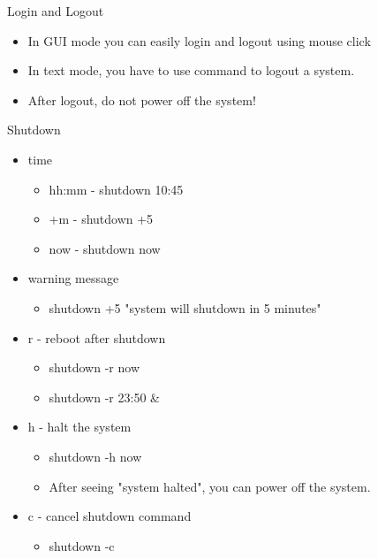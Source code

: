 \documentclass{beamer}
\begin{document}

\begin{frame}{Login and Logout}
\begin{itemize}
\item In GUI mode you can easily login and logout using mouse click
\item In text mode, you have to use command to logout a system.
\item After logout, do not power off the system!
\end{itemize}
\end{frame}

\begin{frame}{Shutdown}
\begin{itemize}
\item time
\begin{itemize}
\item hh:mm - shutdown 10:45
\item +m - shutdown +5
\item now - shutdown now
\end{itemize}
\item warning message
\begin{itemize}
\item shutdown +5 "system will shutdown in 5 minutes"
\end{itemize}
\item r - reboot after shutdown
\begin{itemize}
\item shutdown -r now
\item shutdown -r 23:50 \&
\end{itemize}
\item h - halt the system
\begin{itemize}
\item shutdown -h now
\item After seeing "system halted", you can power off the system.
\end{itemize}
\item c - cancel shutdown command
\begin{itemize}
\item shutdown -c
\end{itemize}
\end{itemize}
\end{frame}
\end{document}
